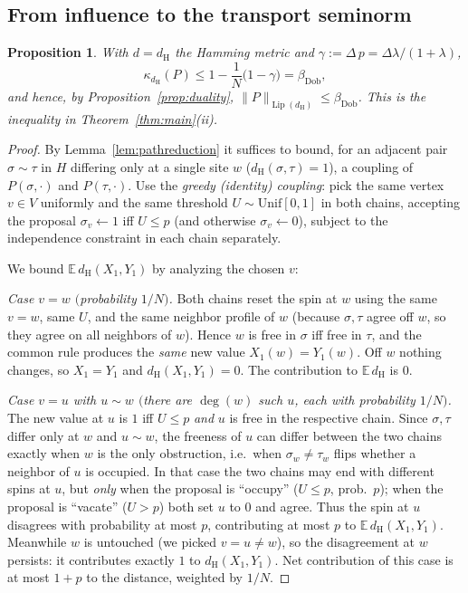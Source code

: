 \documentclass{amsart}
\newtheorem{proposition}{Proposition}
\DeclareMathOperator{\Lip}{Lip}
\newcommand{\E}{\mathbb{E}}
\begin{document}
\subsection{From influence to the transport seminorm}
\begin{proposition}\label{prop:dobrushin}
With $d=d_{\mathrm H}$ the Hamming metric and $\gamma:=\Delta\,p=\Delta\lambda/(1+\lambda)$,
\[
\kappa_{d_{\mathrm H}}(P)\le 1-\frac1N\big(1-\gamma\big)=\beta_{\mathrm{Dob}},
\]
and hence, by Proposition~\ref{prop:duality},
$\|P\|_{\Lip(d_{\mathrm H})}\le\beta_{\mathrm{Dob}}$. This is the inequality in
Theorem~\ref{thm:main}(ii).
\end{proposition}
\begin{proof}
By Lemma~\ref{lem:pathreduction} it suffices to bound, for an adjacent pair
$\sigma\sim\tau$ in $H$ differing only at a single site $w$
($d_{\mathrm H}(\sigma,\tau)=1$), a coupling of $P(\sigma,\cdot)$ and
$P(\tau,\cdot)$. Use the \emph{greedy (identity) coupling}: pick the same vertex
$v\in V$ uniformly and the same threshold $U\sim\mathrm{Unif}[0,1]$ in both
chains, accepting the proposal $\sigma_v\leftarrow1$ iff $U\le p$ (and otherwise
$\sigma_v\leftarrow0$), subject to the independence constraint in each chain
separately.

We bound $\E\,d_{\mathrm H}(X_1,Y_1)$ by analyzing the chosen $v$:

\smallskip
\noindent\emph{Case $v=w$ $($probability $1/N)$.} Both chains reset the spin at
$w$ using the same $v=w$, same $U$, and the same neighbor profile of $w$ (because
$\sigma,\tau$ agree off $w$, so they agree on all neighbors of $w$). Hence $w$ is
free in $\sigma$ iff free in $\tau$, and the common rule produces the
\emph{same} new value $X_1(w)=Y_1(w)$. Off $w$ nothing changes, so $X_1=Y_1$ and
$d_{\mathrm H}(X_1,Y_1)=0$. The contribution to $\E\,d_{\mathrm H}$ is $0$.

\smallskip
\noindent\emph{Case $v=u$ with $u\sim w$ $($there are $\deg(w)$ such $u$, each
with probability $1/N)$.} The new value at $u$ is $1$ iff $U\le p$ \emph{and} $u$
is free in the respective chain. Since $\sigma,\tau$ differ only at $w$ and
$u\sim w$, the freeness of $u$ can differ between the two chains exactly when
$w$ is the only obstruction, i.e.\ when $\sigma_w\neq\tau_w$ flips whether a
neighbor of $u$ is occupied. In that case the two chains may end with different
spins at $u$, but \emph{only} when the proposal is ``occupy'' ($U\le p$, prob.\
$p$); when the proposal is ``vacate'' ($U>p$) both set $u$ to $0$ and agree.
Thus the spin at $u$ disagrees with probability at most $p$, contributing at most
$p$ to $\E\,d_{\mathrm H}(X_1,Y_1)$. Meanwhile $w$ is untouched (we picked
$v=u\neq w$), so the disagreement at $w$ persists: it contributes exactly $1$ to
$d_{\mathrm H}(X_1,Y_1)$. Net contribution of this case is at most $1+p$ to the
distance, weighted by $1/N$.


\end{proof}
\end{document}
